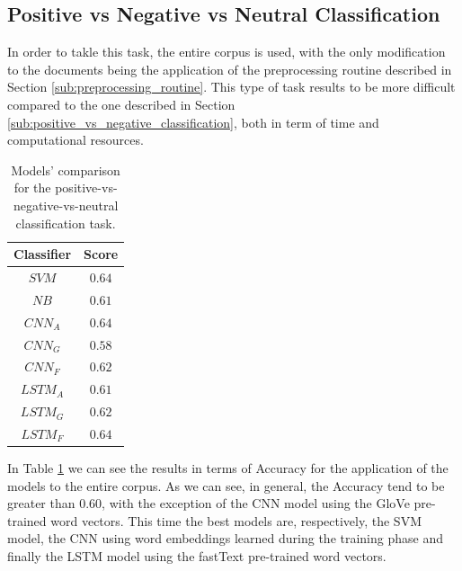 \documentclass[11pt,twocolumn]{article}
\begin{document}
        \subsection{Positive vs Negative vs Neutral Classification} %
        \label{sub:positive_vs_negative_vs_neutral_classification}
            In order to takle this task, the entire corpus is used, with the only modification to the
            documents being the application of the preprocessing routine described in Section
            \ref{sub:preprocessing_routine}. This type of task results to be more difficult compared to
            the one described in Section \ref{sub:positive_vs_negative_classification}, both in term of
            time and computational resources.

            \begin{table}[h]
                \centering
                \begin{tabular}{| c | c |}
                    \hline
                    \textbf{Classifier} & \textbf{Score} \\
                    \hline
                    $SVM$ & $0.64$ \\
                    \hline
                    $NB$ & $0.61$ \\
                    \hline
                    $CNN_A$ & $0.64$ \\
                    \hline
                    $CNN_G$ & $0.58$ \\
                    \hline
                    $CNN_F$ & $0.62$ \\
                    \hline
                    $LSTM_A$ & $0.61$ \\
                    \hline
                    $LSTM_G$ & $0.62$ \\
                    \hline
                    $LSTM_F$ & $0.64$ \\
                    \hline
                \end{tabular}
                \caption{Models' comparison for the positive-vs-negative-vs-neutral classification task.}
                \label{tab:a_comparison}
            \end{table}

            \noindent
            In Table \ref{tab:a_comparison} we can see the results in terms of Accuracy for the application
            of the models to the entire corpus. As we can see, in general, the Accuracy tend to be greater
            than $0.60$, with the exception of the CNN model using the GloVe pre-trained word vectors. This
            time the best models are, respectively, the SVM model, the CNN using word embeddings learned
            during the training phase and finally the LSTM model using the fastText pre-trained word
            vectors.
\end{document}

